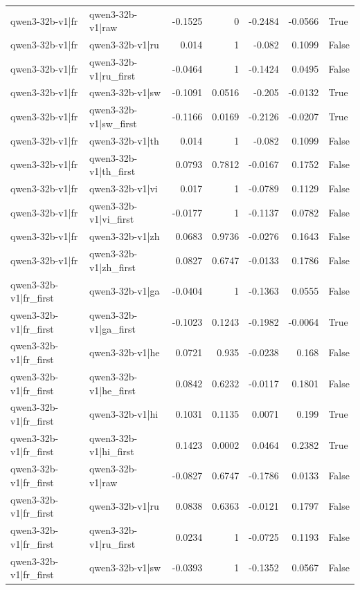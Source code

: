 \begin{table}
\begin{tabular}{l l r r r r l}
qwen3-32b-v1|fr & qwen3-32b-v1|raw & -0.1525 & 0 & -0.2484 & -0.0566 & True \\
qwen3-32b-v1|fr & qwen3-32b-v1|ru & 0.014 & 1 & -0.082 & 0.1099 & False \\
qwen3-32b-v1|fr & qwen3-32b-v1|ru_first & -0.0464 & 1 & -0.1424 & 0.0495 & False \\
qwen3-32b-v1|fr & qwen3-32b-v1|sw & -0.1091 & 0.0516 & -0.205 & -0.0132 & True \\
qwen3-32b-v1|fr & qwen3-32b-v1|sw_first & -0.1166 & 0.0169 & -0.2126 & -0.0207 & True \\
qwen3-32b-v1|fr & qwen3-32b-v1|th & 0.014 & 1 & -0.082 & 0.1099 & False \\
qwen3-32b-v1|fr & qwen3-32b-v1|th_first & 0.0793 & 0.7812 & -0.0167 & 0.1752 & False \\
qwen3-32b-v1|fr & qwen3-32b-v1|vi & 0.017 & 1 & -0.0789 & 0.1129 & False \\
qwen3-32b-v1|fr & qwen3-32b-v1|vi_first & -0.0177 & 1 & -0.1137 & 0.0782 & False \\
qwen3-32b-v1|fr & qwen3-32b-v1|zh & 0.0683 & 0.9736 & -0.0276 & 0.1643 & False \\
qwen3-32b-v1|fr & qwen3-32b-v1|zh_first & 0.0827 & 0.6747 & -0.0133 & 0.1786 & False \\
qwen3-32b-v1|fr_first & qwen3-32b-v1|ga & -0.0404 & 1 & -0.1363 & 0.0555 & False \\
qwen3-32b-v1|fr_first & qwen3-32b-v1|ga_first & -0.1023 & 0.1243 & -0.1982 & -0.0064 & True \\
qwen3-32b-v1|fr_first & qwen3-32b-v1|he & 0.0721 & 0.935 & -0.0238 & 0.168 & False \\
qwen3-32b-v1|fr_first & qwen3-32b-v1|he_first & 0.0842 & 0.6232 & -0.0117 & 0.1801 & False \\
qwen3-32b-v1|fr_first & qwen3-32b-v1|hi & 0.1031 & 0.1135 & 0.0071 & 0.199 & True \\
qwen3-32b-v1|fr_first & qwen3-32b-v1|hi_first & 0.1423 & 0.0002 & 0.0464 & 0.2382 & True \\
qwen3-32b-v1|fr_first & qwen3-32b-v1|raw & -0.0827 & 0.6747 & -0.1786 & 0.0133 & False \\
qwen3-32b-v1|fr_first & qwen3-32b-v1|ru & 0.0838 & 0.6363 & -0.0121 & 0.1797 & False \\
qwen3-32b-v1|fr_first & qwen3-32b-v1|ru_first & 0.0234 & 1 & -0.0725 & 0.1193 & False \\
qwen3-32b-v1|fr_first & qwen3-32b-v1|sw & -0.0393 & 1 & -0.1352 & 0.0567 & False \\

\end{tabular}
\end{table}
